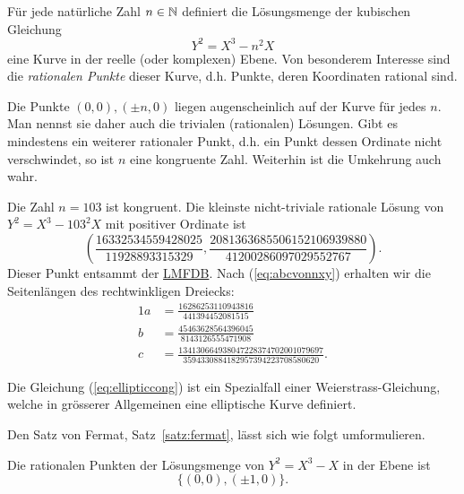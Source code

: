 Für jede natürliche Zahl $n\in{\mathbb{N}}$ definiert
die Lösungsmenge der kubischen Gleichung
\begin{equation}
  \label{eq:ellipticcong}
  Y^2 = X^3-n^2X  
\end{equation}
eine Kurve in der reelle (oder komplexen) Ebene. Von besonderem
Interesse sind die \emph{rationalen Punkte} dieser Kurve, d.h. Punkte,
deren Koordinaten rational sind.

Die Punkte $(0,0),(\pm n,0)$ liegen augenscheinlich auf der Kurve für
jedes $n$. Man nennst sie daher auch die trivialen (rationalen)
Lösungen.
Gibt es mindestens ein weiterer rationaler Punkt, d.h. ein
Punkt dessen Ordinate nicht verschwindet, so ist $n$ eine kongruente
Zahl.
Weiterhin ist die Umkehrung auch wahr. 

\begin{beispiel}
  Die Zahl $n=103$ ist kongruent. Die kleinste nicht-triviale
  rationale Lösung
  von $Y^2 = X^3-103^2X$ mit positiver Ordinate ist
  \begin{equation*}
    \left(\frac{16332534559428025}{11928893315329}, \frac{2081363685506152106939880}{41200286097029552767}\right).
  \end{equation*}
  Dieser Punkt entsammt der \href{https://www.lmfdb.org/EllipticCurve/Q/339488/b/3}{LMFDB}.
  Nach (\ref{eq:abcvonnxy}) erhalten wir die Seitenlängen des rechtwinkligen Dreiecks:
  \begin{alignat*}1
    a &=\frac{16286253110943816}{441394452081515}\\
    b &=\frac{45463628564396045}{8143126555471908}\\
    c &= \frac{134130664938047228374702001079697}{3594330884182957394223708580620}.
  \end{alignat*}
\end{beispiel}

Die Gleichung (\ref{eq:ellipticcong}) ist ein Spezialfall einer
Weierstrass-Gleichung, welche in grösserer Allgemeinen eine
elliptische Kurve definiert.

Den Satz von Fermat, Satz~\ref{satz:fermat}, lässt sich wie folgt
umformulieren.

\begin{theorem}
  \label{satz:fermat2}
  Die rationalen Punkten der Lösungsmenge von $Y^2 = X^3-X$ in der Ebene ist
  $$
  \{(0,0),(\pm 1,0)\}.
  $$
\end{theorem}


